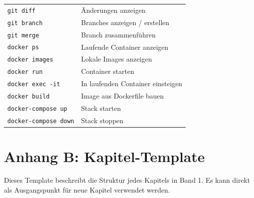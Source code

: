 \begin{tabularx}{\textwidth}{@{}lX@{}}
\texttt{git diff}   & Änderungen anzeigen \\
\texttt{git branch} & Branches anzeigen / erstellen \\
\texttt{git merge}  & Branch zusammenführen \\
\midrule
\texttt{docker ps}           & Laufende Container anzeigen \\
\texttt{docker images}       & Lokale Images anzeigen \\
\texttt{docker run}          & Container starten \\
\texttt{docker exec -it}     & In laufenden Container einsteigen \\
\texttt{docker build}        & Image aus Dockerfile bauen \\
\texttt{docker-compose up}   & Stack starten \\
\texttt{docker-compose down} & Stack stoppen \\
\bottomrule
\end{tabularx}

\chapter{Anhang B: Kapitel-Template}

Dieses Template beschreibt die Struktur jedes Kapitels in Band 1.
Es kann direkt als Ausgangspunkt für neue Kapitel verwendet werden.


